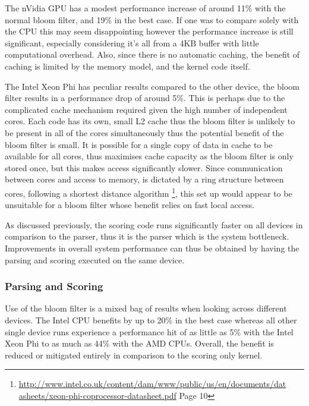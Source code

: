 The nVidia GPU has a modest performance increase of around 11\% with the normal
bloom filter, and 19\% in the best case. If one was to compare solely with the
CPU this may seem disappointing however the performance increase is still
significant, especially considering it's all from a 4KB buffer with little
computational overhead. Also, since there is no automatic caching, the benefit
of caching is limited by the memory model, and the kernel code itself.

The Intel Xeon Phi has peculiar results compared to the other device, the bloom
filter results in a performance drop of around 5\%. This is perhaps due to the
complicated cache mechanism required given the high number of independent cores.
Each code has its own, small L2 cache thus the bloom filter is unlikely to be
present in all of the cores simultaneously thus the potential benefit of the
bloom filter is small. It is possible for a single copy of data in cache to be
available for all cores, thus maximises cache capacity as the bloom filter is
only stored once, but this makes access significantly slower. Since
communication between cores and access to memory, is dictated by a ring
structure between cores, following a shortest distance algorithm
\footnote{\url{http://www.intel.co.uk/content/dam/www/public/us/en/documents/dat
asheets/xeon-phi-coprocessor-datasheet.pdf} Page 10}, this set up would appear
to be unsuitable for a bloom filter whose benefit relies on fast local access.

As discussed previously, the scoring code runs significantly faster on all
devices in comparison to the parser, thus it is the parser which is the system
bottleneck. Improvements in overall system performance can thus be obtained by
having the parsing and scoring executed on the same device.

\subsubsection{Parsing and Scoring}

Use of the bloom filter is a mixed bag of results when looking across different
devices. The Intel CPU benefits by up to 20\% in the best case whereas all other
single device runs experience a performance hit of as little as 5\% with the
Intel Xeon Phi to as much as 44\% with the AMD CPUs. Overall, the benefit is
reduced or mitigated entirely in comparison to the scoring only kernel.

